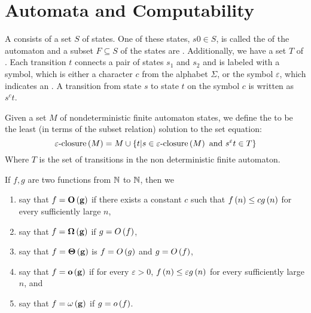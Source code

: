 \chapter{Automata and Computability}

\begin{defi}
A  consists of a set $S$ of states. One of these states, $s0\in S$, is called the  of the automaton and a subset $F\subseteq S$ of the states are . Additionally, we have a set $T$ of . Each transition $t$ connects a pair of states $s_1$ and $s_2$ and is labeled with a symbol, which is either a character $c$ from the alphabet $\Sigma$, or the symbol $\varepsilon$, which indicates an . A transition from state $s$ to state $t$ on the symbol $c$ is written as $s^ct$.\cite{mogensen2009basics}
\end{defi}

\begin{defi}
Given a set $M$ of nondeterministic finite automaton states, we define the  to be the least (in terms of the subset relation) solution to the set equation:
\begin{equation}
\varepsilon\mbox{-closure}\left(M\right) = M\cup \left\{t|s\in \varepsilon\mbox{-closure}\left(M\right)\mbox{ and }s^\varepsilon t\in T \right\}
\end{equation}
Where $T$ is the set of transitions in the non deterministic finite automaton.\cite{mogensen2009basics}
\end{defi}

\begin{defi}
If $f,g$ are two functions from $\mathbb{N}$ to $\mathbb{N}$, then we 
\begin{enumerate}
 \item say that $f=\term{\bigoh{g}}$ if there exists a constant $c$ such that $f\left(n\right)\leq cg\left(n\right)$ for every sufficiently large $n$,
 \item say that $f=\term{\bigomega{g}}$ if $g = O\left(f\right)$,
 \item say that $f=\term{\bigtheta{g}}$ is $f = O\left(g\right)$ and $g = O\left(f\right)$,
 \item say that $f=\term{\smalloh{g}}$ if for every $\varepsilon>0$, $f\left(n\right)\leq\varepsilon g\left(n\right)$ for every sufficiently large $n$, and
 \item say that $f=\term{\smallomega{g}}$ if $g=o\left(f\right)$.
\end{enumerate}
\cite{arora2009computational}
\end{defi}

